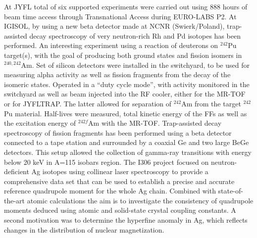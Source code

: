 At JYFL total of six supported experiments were carried out using 888 hours of beam time access through Transnational Access during EURO-LABS P2. At IGISOL, by using a new beta detector made at NCNR (Swierk/Poland), trap-assisted decay spectroscopy of very neutron-rich Rh and Pd isotopes has been performed. An interesting experiment using a reaction of deuterons on $^{242}$Pu target(s), with the goal of producing both ground states and fission isomers in $^{240,242}$Am. Set of silicon detectors were installed in the switchyard, to be used for measuring alpha activity as well as fission fragments from the decay of the isomeric states. Operated in a “duty cycle mode”, with activity monitored in the switchyard as well as beam injected into the RF cooler, either for the MR-TOF or for JYFLTRAP. The latter allowed for separation of $^{242}$Am from the target $^{242}$Pu material. Half-lives were measured, total kinetic energy of the FFs as well as the excitation energy of $^{242f}$Am with the MR-TOF. Trap-assisted decay spectroscopy of fission fragments has been performed using a beta detector connected to a tape station and surrounded by a coaxial Ge and two large BeGe detectors. This setup allowed the collection of gamma-ray transitions with energy below 20 keV in A=115 isobars region. The I306 project focused on neutron-deficient Ag isotopes using collinear laser spectroscopy to provide a comprehensive data set that can be used to establish a precise and accurate reference quadrupole moment for the whole Ag chain. Combined with state-of-the-art atomic calculations the aim is to investigate the consistency of quadrupole moments deduced using atomic and solid-state crystal coupling constants. A second motivation was to determine the hyperfine anomaly in Ag, which reflects changes in the distribution of nuclear magnetization. 


